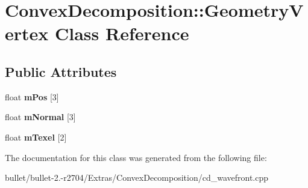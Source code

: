 \hypertarget{class_convex_decomposition_1_1_geometry_vertex}{\section{Convex\+Decomposition\+:\+:Geometry\+Vertex Class Reference}
\label{class_convex_decomposition_1_1_geometry_vertex}
}
\subsection*{Public Attributes}
\begin{DoxyCompactItemize}
\item 
\hypertarget{class_convex_decomposition_1_1_geometry_vertex_aec35a45ac19a027d53579549ad2c3e6e}{float {\bfseries m\+Pos} \mbox{[}3\mbox{]}}\label{class_convex_decomposition_1_1_geometry_vertex_aec35a45ac19a027d53579549ad2c3e6e}

\item 
\hypertarget{class_convex_decomposition_1_1_geometry_vertex_abe47af13c20f623d6219436336f1099b}{float {\bfseries m\+Normal} \mbox{[}3\mbox{]}}\label{class_convex_decomposition_1_1_geometry_vertex_abe47af13c20f623d6219436336f1099b}

\item 
\hypertarget{class_convex_decomposition_1_1_geometry_vertex_a4914da14dc9efb0fc7333d2b60ae7451}{float {\bfseries m\+Texel} \mbox{[}2\mbox{]}}\label{class_convex_decomposition_1_1_geometry_vertex_a4914da14dc9efb0fc7333d2b60ae7451}

\end{DoxyCompactItemize}


The documentation for this class was generated from the following file\+:\begin{DoxyCompactItemize}
\item 
bullet/bullet-\/2.-\/r2704/\+Extras/\+Convex\+Decomposition/cd\+\_\+wavefront.\+cpp\end{DoxyCompactItemize}
